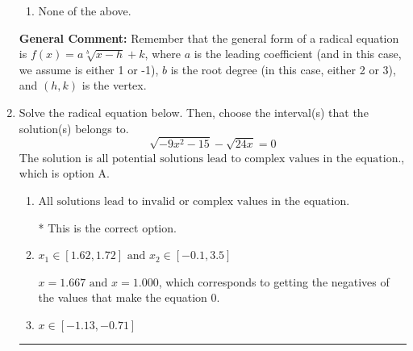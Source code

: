 \documentclass{extbook}[14pt]
\newcommand{\litem}[1]{\item #1

\rule{\textwidth}{0.4pt}}
\begin{document}
\begin{enumerate}
{\begin{enumerate}[label=\Alph*.]
\item None of the above.\end{enumerate}
\textbf{General Comment:} Remember that the general form of a radical equation is $ f(x) = a \sqrt[b]{x - h} + k $, where $a$ is the leading coefficient (and in this case, we assume is either 1 or -1), $b$ is the root degree (in this case, either 2 or 3), and $(h, k)$ is the vertex.
}
\litem{
Solve the radical equation below. Then, choose the interval(s) that the solution(s) belongs to.
\[ \sqrt{-9 x^2 - 15} - \sqrt{24 x} = 0 \]The solution is \( \text{all potential solutions lead to complex values in the equation.} \), which is option A.\begin{enumerate}[label=\Alph*.]
\item \( \text{All solutions lead to invalid or complex values in the equation.} \)

* This is the correct option.
\item \( x_1 \in [1.62, 1.72] \text{ and } x_2 \in [-0.1,3.5] \)

$x = 1.667 \text{ and } x = 1.000$, which corresponds to getting the negatives of the values that make the equation 0.
\item \( x \in [-1.13,-0.71] \)


\end{enumerate}}
\end{enumerate}
\end{document}
